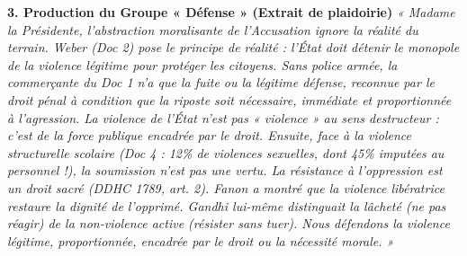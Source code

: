\documentclass[11pt]{article}
\newcommand{\cle}[1]{{\popxbold\color{popdark}#1}}
\begin{document}
\begin{exoresolu}
\textbf{3. Production du Groupe « Défense » (Extrait de plaidoirie)}
\emph{« Madame la Présidente, l'abstraction moralisante de l'Accusation ignore la réalité du terrain. Weber (Doc 2) pose le principe de réalité : l'État \emph{doit} détenir le monopole de la violence \emph{légitime} pour protéger les citoyens. Sans police armée, la commerçante du Doc 1 n'a que la fuite ou la légitime défense, reconnue par le droit pénal à condition que la riposte soit nécessaire, immédiate et proportionnée à l'agression. La violence de l'État n'est pas « violence » au sens destructeur : c'est de la \cle{force publique} encadrée par le droit. Ensuite, face à la violence structurelle scolaire (Doc 4 : 12\% de violences sexuelles, dont 45\% imputées au personnel !), la soumission n'est pas une vertu. La résistance à l'oppression est un droit sacré (DDHC 1789, art. 2). Fanon a montré que la violence libératrice restaure la dignité de l'opprimé. Gandhi lui-même distinguait la lâcheté (ne pas réagir) de la non-violence active (résister sans tuer). Nous défendons la violence \emph{légitime, proportionnée, encadrée par le droit ou la nécessité morale}. »}


\end{exoresolu}
\end{document}
